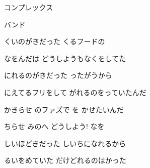 \documentclass[a4paper,tate,twocolumn,12pt]{ltjtarticle}
\begin{document}
\thispagestyle{empty}

\begin{center}
{\LARGE {}コンプレックス}

{\large {}バンド}
\end{center}

\vspace{1em}

\begin{flushleft}

\noindent\begin{minipage}{\linewidth}
くいのがきだった くるフードの

なをんだは どうしようもなくをしてた
\end{minipage}

\vspace{2em}

\noindent\begin{minipage}{\linewidth}
にれるのがきだった ったがうから

にえてるフリをして がれるのをっていたんだ
\end{minipage}

\vspace{2em}

\noindent\begin{minipage}{\linewidth}
かきらせ のファズで を かせたいんだ

ちらせ みのへ どうしよう! なを
\end{minipage}

\vspace{2em}

\noindent\begin{minipage}{\linewidth}
しいほどきだった しいちになれるから

るいをめていた だけどれるのはかった
\end{minipage}


\end{flushleft}
\end{document}
